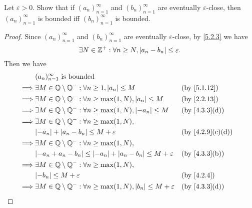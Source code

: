 \begin{ex}\label{ex:5.2.2}
  Let \(\varepsilon > 0\).
  Show that if \((a_n)_{n = 1}^{\infty}\) and \((b_n)_{n = 1}^{\infty}\) are eventually \(\varepsilon\)-close, then \((a_n)_{n = 1}^{\infty}\) is bounded iff \((b_n)_{n = 1}^{\infty}\) is bounded.
\end{ex}

\begin{proof}
  Since \((a_n)_{n = 1}^{\infty}\) and \((b_n)_{n = 1}^{\infty}\) are eventually \(\varepsilon\)-close, by \cref{5.2.3} we have
  \[
    \exists N \in \mathbb{Z}^+ : \forall n \geq N, \left\lvert a_n - b_n\right\rvert \leq \varepsilon.
  \]
  Then we have
  \begin{align*}
             & (a_n)_{n = 1}^\infty \text{ is bounded}                                                                          \\
    \implies & \exists M \in \Q \setminus \Q^- : \forall n \geq 1, \abs{a_n} \leq M                        &  & \by{5.1.12}     \\
    \implies & \exists M \in \Q \setminus \Q^- : \forall n \geq \max(1, N), \abs{a_n} \leq M               &  & \by{2.2.13}     \\
    \implies & \exists M \in \Q \setminus \Q^- : \forall n \geq \max(1, N), \abs{-a_n} \leq M              &  & \by{4.3.3}[d]   \\
    \implies & \exists M \in \Q \setminus \Q^- : \forall n \geq \max(1, N),                                                     \\
             & \abs{-a_n} + \abs{a_n - b_n} \leq M + \varepsilon                                           &  & \by{4.2.9}[c,d] \\
    \implies & \exists M \in \Q \setminus \Q^- : \forall n \geq \max(1, N),                                                     \\
             & \abs{-a_n + a_n - b_n} \leq \abs{-a_n} + \abs{a_n - b_n} \leq M + \varepsilon               &  & \by{4.3.3}[b]   \\
    \implies & \exists M \in \Q \setminus \Q^- : \forall n \geq \max(1, N),                                                     \\
             & \abs{-b_n} \leq M + \varepsilon                                                             &  & \by{4.2.4}      \\
    \implies & \exists M \in \Q \setminus \Q^- : \forall n \geq \max(1, N), \abs{b_n} \leq M + \varepsilon &  & \by{4.3.3}[d]   \\

\end{align*}
\end{proof}
